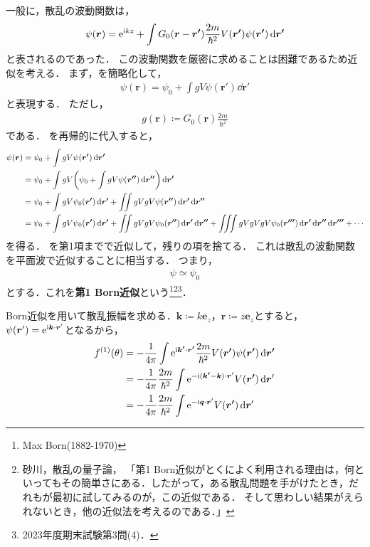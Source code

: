 \documentclass{report}
\begin{document}
  一般に，散乱の波動関数は，
  \begin{align}
    \psi(\bm{r}) = \mathrm{e}^{\mathrm{i} kz} + \int G_0 (\bm{r} - \bm{r'}) \frac{2m}{\hbar^2} V(\bm{r'}) \psi(\bm{r'}) \dd{\bm{r'}}\label{wave-funtion-of-scattering}
  \end{align}
  と表されるのであった．
  この波動関数を厳密に求めることは困難であるため近似を考える．
  まず，を簡略化して，
  \begin{align}
    \psi(\bm{r}) = \psi_0 + \int g V \psi(\bm{r}') \dd{\bm{r}'}\label{simple-wave-funtion-of-scattering}
  \end{align}
  と表現する．
  ただし，
  \begin{align}
    g(\bm{r}) \coloneqq G_0(\bm{r})\frac{2m}{\hbar^2}
  \end{align}
  である．
  を再帰的に代入すると，
  \begin{align}
    \psi(\bm{r}) &= \psi_0 + \int g V \psi(\bm{r'}) \dd{\bm{r'}} \\
    &= \psi_0 + \int gV \qty(\psi_0 + \int g V \psi(\bm{r''}) \dd{\bm{r''}}) \dd{\bm{r'}} \\
    &= \psi_0 + \int g V \psi_0(\bm{r'}) \dd{\bm{r'}} + \iint gVgV \psi(\bm{r''}) \dd{\bm{r'}} \dd{\bm{r''}} \\
    &= \psi_0 + \int g V \psi_0(\bm{r'}) \dd{\bm{r'}} + \iint gVgV \psi_0(\bm{r''}) \dd{\bm{r'}} \dd{\bm{r''}} + \iiint gVgVgV \psi_0(\bm{r'''}) \dd{\bm{r'}} \dd{\bm{r''}} \dd{\bm{r'''}} + \cdots\label{dozens-of-gv}
  \end{align}
  を得る．
  を第1項までで近似して，残りの項を捨てる．
  これは散乱の波動関数を平面波で近似することに相当する．
  つまり，
  \begin{align}
    \psi \simeq \psi_0
  \end{align}
  とする．これを\textbf{第1 Born近似}という\footnote{Max Born(1882-1970)}\footnote{砂川，散乱の量子論，
  「第1 Born近似がとくによく利用される理由は，何といってもその簡単さにある．したがって，ある散乱問題を手がけたとき，だれもが最初に試してみるのが，この近似である．
  そして思わしい結果がえられないとき，他の近似法を考えるのである．」}\footnote{2023年度期末試験第3問(4)．}．
  \par
  Born近似を用いて散乱振幅を求める．$\bm{k} \coloneqq k\bm{e}_z$，$\bm{r} \coloneqq z\bm{e}_z$とすると，
  $\psi(\bm{r}') = \mathrm{e}^{\mathrm{i} \bm{k}\cdot\bm{r}'}$となるから，
  \begin{align}
    f^{(1)}(\theta) &= -\frac{1}{4\pi} \int \mathrm{e}^{\mathrm{i} \bm{k'}\cdot\bm{r'}} \frac{2m}{\hbar^2} V(\bm{r'}) \psi(\bm{r'}) \dd{\bm{r'}} \\
    &= -\frac{1}{4\pi}\frac{2m}{\hbar^2}\int\mathrm{e}^{-\mathrm{i} (\bm{k'} - \bm{k})\cdot\bm{r}'} V(\bm{r'}) \dd{\bm{r}'} \\
    &= -\frac{1}{4\pi}\frac{2m}{\hbar^2}\int\mathrm{e}^{-\mathrm{i} \bm{q} \cdot \bm{r}'} V(\bm{r'}) \dd{\bm{r}'}\label{potential-fourier-transform}
  \end{align}
\end{document}
